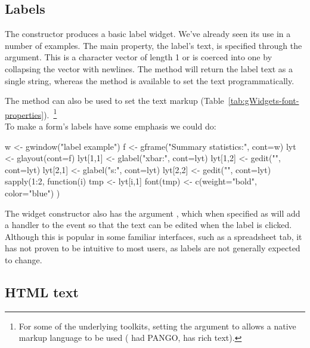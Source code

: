 

\subsection{Labels}
\label{asec:gWidgets-labels}

The  constructor produces a basic label
widget. We've already seen its use in a number of examples. The main
property, the label's text, is specified through the
 argument. This is a character vector of length
1 or is coerced into one by collapsing the vector with newlines. The
 method will return the label text as a single
string, whereas the  method is
available to set the text programmatically.

The  method
can also be used to set the text markup
(Table~\ref{tab:gWidgets-font-properties}).~\footnote{For some of the underlying toolkits, setting the argument
 to  allows a native markup language
to be used (\GTK\/ had PANGO, \Qt\/ has rich text).}
\\

To make a form's labels have some emphasis we could do:
\begin{Schunk}
\begin{Sinput}
 w <- gwindow("label example")
 f <- gframe("Summary statistics:", cont=w)
 lyt <- glayout(cont=f)
 lyt[1,1] <- glabel("xbar:", cont=lyt)
 lyt[1,2] <- gedit("", cont=lyt)
 lyt[2,1] <- glabel("s:", cont=lyt)
 lyt[2,2] <- gedit("", cont=lyt)
 sapply(1:2, function(i) {
   tmp <- lyt[i,1]
   font(tmp) <- c(weight="bold", color="blue")
 })
\end{Sinput}
\end{Schunk}


The widget constructor also has the argument
, which when specified as  will
add a handler to the event so that the text can be edited when the
label is clicked.  Although this is popular in some familiar
interfaces, such as a spreadsheet tab, it has not proven to be
intuitive to most users, as labels are not generally expected to change.

\subsection{HTML text}
\label{sec:html-text}

